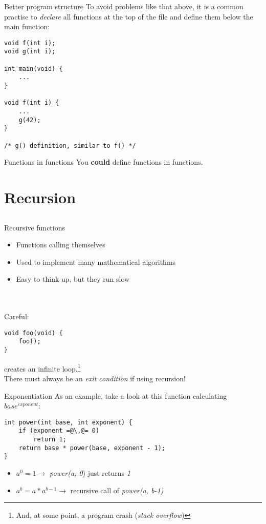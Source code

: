 \begin{frame}[fragile]{Better program structure}
	To avoid problems like that above, it is a common practise to \textit{declare} all functions at the top of the file and define them below the main function:
	\begin{lstlisting}
void f(int i);
void g(int i);

int main(void) {
	...
}

void f(int i) {
	...
	g(42);
}

/* g() definition, similar to f() */
\end{lstlisting}
\end{frame}
\begin{frame}{Functions in functions}
	You \textbf{could} define functions in functions.\footnotemark
	
\end{frame}
\section{Recursion}
\subsection{}
\begin{frame}[fragile]{Recursive functions}
	\begin{itemize}
		\item Functions calling themselves
		\item Used to implement many mathematical algorithms
		\item Easy to think up, but they run slow
	\end{itemize} \ \\ \ \\
	Careful:
	\begin{lstlisting}
void foo(void) {
	foo();
}
\end{lstlisting}
	creates an infinite loop.\footnote{And, at some point, a program crash (\textit{stack overflow})} \\
	There must always be an \textit{exit condition} if using recursion!
\end{frame}
\begin{frame}[fragile]{Exponentiation}
As an example, take a look at this function calculating $base^{exponent}$:
	\begin{lstlisting}
int power(int base, int exponent) {
	if (exponent =@\,@= 0)
		return 1;
	return base * power(base, exponent - 1);
}
\end{lstlisting}
	\begin{itemize}
		\item $a^{0} = 1 \rightarrow$ \textit{power(a, 0}) just returns \textit{1}
		\item $a^{b} = a * a^{b-1} \rightarrow$ recursive call of \textit{power(a, b-1)}
	\end{itemize}
\end{frame}

